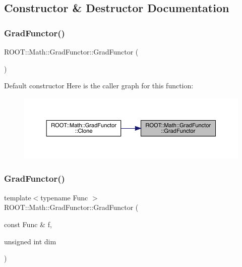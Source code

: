 \subsection{Constructor \& Destructor Documentation}
\mbox{\label{classROOT_1_1Math_1_1GradFunctor_a68c75192981688e292ee84be652a8ec4}} 
\subsubsection{\texorpdfstring{GradFunctor()}{GradFunctor()}\hspace{0.1cm}{\footnotesize\ttfamily [1/10]}}
{\footnotesize\ttfamily R\+O\+O\+T\+::\+Math\+::\+Grad\+Functor\+::\+Grad\+Functor (\begin{DoxyParamCaption}{ }\end{DoxyParamCaption})\hspace{0.3cm}{\ttfamily [inline]}}

Default constructor Here is the caller graph for this function\+:\nopagebreak
\begin{figure}[H]
\begin{center}
\leavevmode
\includegraphics[width=350pt]{de/d74/classROOT_1_1Math_1_1GradFunctor_a68c75192981688e292ee84be652a8ec4_icgraph}
\end{center}
\end{figure}
\mbox{\label{classROOT_1_1Math_1_1GradFunctor_a9cdbcd3d49494b4209524b3c5b3172d2}} 
\subsubsection{\texorpdfstring{GradFunctor()}{GradFunctor()}\hspace{0.1cm}{\footnotesize\ttfamily [2/10]}}
{\footnotesize\ttfamily template$<$typename Func $>$ \\
R\+O\+O\+T\+::\+Math\+::\+Grad\+Functor\+::\+Grad\+Functor (\begin{DoxyParamCaption}\item[{const Func \&}]{f,  }\item[{unsigned int}]{dim }\end{DoxyParamCaption})\hspace{0.3cm}{\ttfamily [inline]}}

